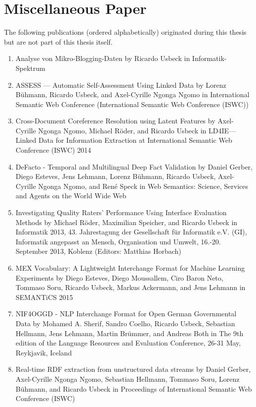 \section*{Miscellaneous Paper}
The following publications (ordered alphabetically) originated during this thesis but are not part of this thesis itself. 
\begin{enumerate}
    \item Analyse von Mikro-Blogging-Daten by Ricardo Usbeck in Informatik-Spektrum
    \item ASSESS --- Automatic Self-Assessment Using Linked Data by Lorenz Bühmann, Ricardo Usbeck, and Axel-Cyrille Ngonga Ngomo in International Semantic Web Conference (International Semantic Web Conference (ISWC)) 
    \item Cross-Document Coreference Resolution using Latent Features by Axel-Cyrille Ngonga Ngomo, Michael Röder, and Ricardo Usbeck in LD4IE---Linked Data for Information Extraction at International Semantic Web Conference (ISWC) 2014 
    \item DeFacto - Temporal and Multilingual Deep Fact Validation by Daniel Gerber, Diego Esteves, Jens Lehmann, Lorenz Bühmann, Ricardo Usbeck, Axel-Cyrille Ngonga Ngomo, and René Speck in Web Semantics: Science, Services and Agents on the World Wide Web
    \item Investigating Quality Raters' Performance Using Interface Evaluation Methods by Michael Röder, Maximilian Speicher, and Ricardo Usbeck in Informatik 2013, 43. Jahrestagung der Gesellschaft für Informatik e.V. (GI), Informatik angepasst an Mensch, Organisation und Umwelt, 16.-20. September 2013, Koblenz (Editors: Matthias Horbach) 
    \item MEX Vocabulary: A Lightweight Interchange Format for Machine Learning Experiments by Diego Esteves, Diego Moussallem, Ciro Baron Neto, Tommaso Soru, Ricardo Usbeck, Markus Ackermann, and Jens Lehmann in SEMANTiCS 2015  
    \item NIF4OGGD - NLP Interchange Format for Open German Governmental Data by Mohamed A. Sherif, Sandro Coelho, Ricardo Usbeck, Sebastian Hellmann, Jens Lehmann, Martin Brümmer, and Andreas Both in The 9th edition of the Language Resources and Evaluation Conference, 26-31 May, Reykjavik, Iceland  
    \item Real-time RDF extraction from unstructured data streams by Daniel Gerber, Axel-Cyrille Ngonga Ngomo, Sebastian Hellmann, Tommaso Soru, Lorenz Bühmann, and Ricardo Usbeck in Proceedings of International Semantic Web Conference (ISWC) 
\end{enumerate}